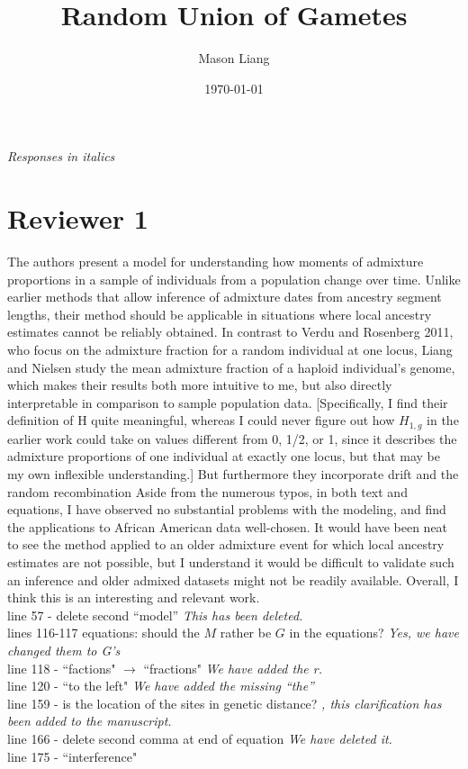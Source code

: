 \documentclass[11pt]{amsart}
\title{Random Union of Gametes}
\author{Mason Liang}
\date{\today}
\begin{document}
\textit{Responses in italics}
\section{Reviewer 1}
The authors present a model for understanding how moments of admixture
proportions in a sample of individuals from a population change over time.
Unlike earlier methods that allow inference of admixture dates from ancestry
segment lengths, their method should be applicable in situations where local
ancestry estimates cannot be reliably obtained. In contrast to Verdu and
Rosenberg 2011, who focus on the admixture fraction for a random individual at
one locus, Liang and Nielsen study the mean admixture fraction of a haploid
individual’s genome, which makes their results both more intuitive to me, but
also directly interpretable in comparison to sample population data.
[Specifically, I find their definition of H quite meaningful, whereas I could
never figure out how $H_{1,g}$ in the earlier work could take on values
different from 0, 1/2, or 1, since it describes the admixture proportions of one
individual at exactly one locus, but that may be my own inflexible
understanding.] But furthermore they incorporate drift and the random
recombination Aside from the numerous typos, in both text and equations, I have
observed no substantial problems with the modeling, and find the applications to
African American data well-chosen. It would have been neat to see the method
applied to an older admixture event for which local ancestry estimates are not
possible, but I understand it would be difficult to validate such an inference
and older admixed datasets might not be readily available. Overall, I think this
is an interesting and relevant work.\\
line 57 - delete second “model”
	\textit{This has been deleted.}\\
lines 116-117 equations: should the $M$ rather be $G$ in the equations?
	\textit{Yes, we have changed them to G's}\\
line 118 - ``factions" $\rightarrow$ ``fractions"
	\textit{We have added the r.}\\
line 120 - ``to the left"
	\textit{We have added the missing ``the''}\\
line 159 - is the location of the sites in genetic distance?
	\textit{, this clarification has been added to the manuscript.}\\
line 166 - delete second comma at end of equation
	\textit{We have deleted it.}\\
line 175 - ``interference"
\end{document}
